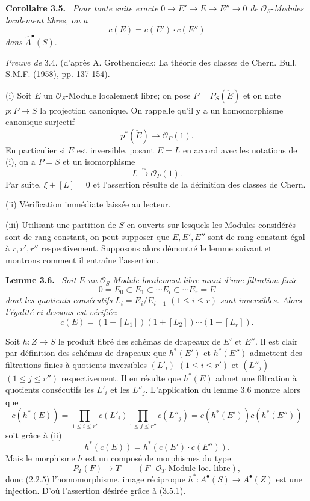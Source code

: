 \documentclass[11pt]{article}
\newenvironment{statement}[1]{\par\medskip\noindent\textbf{#1.}\ }{\par\medskip}
\begin{document}
\begin{statement}{Corollaire 3.5}
\emph{Pour toute suite exacte} $0\to E'\to E\to E''\to0$ \emph{de} $\mathcal O_S$-\emph{Modules localement libres, on a}
\[
c(E)=c(E')\cdot c(E'')
\]
\emph{dans} $\widehat A^{\bullet}(S)$.
\end{statement}

\emph{Preuve de} 3.4. (d'après A. Grothendieck: La théorie des classes de Chern. Bull. S.M.F. (1958), pp. 137-154).

(i)
Soit $E$ un $\mathcal O_S$-Module localement libre; on pose $P=P_S(\check E)$ et on note $p:P\to S$ la projection canonique. On rappelle qu'il y a un homomorphisme canonique surjectif
\[
p^*(\check E)\longrightarrow \mathcal O_P(1).
\]
En particulier si $E$ est inversible, posant $E=L$ en accord avec les notations de (i), on a $P=S$ et un isomorphisme
\[
L\xrightarrow{\sim}\mathcal O_P(1).
\]
Par suite, $\xi+[L]=0$ et l'assertion résulte de la définition des classes de Chern.

(ii) Vérification immédiate laissée au lecteur.

(iii) Utilisant une partition de $S$ en ouverts sur lesquels les Modules considérés sont de rang constant, on peut supposer que $E,E',E''$ sont de rang constant égal à $r,r',r''$ respectivement. Supposons alors démontré le lemme suivant et montrons comment il entraîne l'assertion.

\begin{statement}{Lemme 3.6}
\emph{Soit} $E$ \emph{un} $\mathcal O_S$-\emph{Module localement libre muni d'une filtration finie}
\[
0=E_0\subset E_1\subset\cdots E_i\subset\cdots E_r=E
\]
\emph{dont les quotients consécutifs} $L_i=E_i/E_{i-1}$ $(1\le i\le r)$ \emph{sont inversibles. Alors l'égalité ci-dessous est vérifiée}:
\[
c(E)=(1+[L_1])(1+[L_2])\cdots(1+[L_r]).
\]
\end{statement}

Soit $h:Z\to S$ le produit fibré des schémas de drapeaux de $E'$ et $E''$. Il est clair par définition des schémas de drapeaux que $h^*(E')$ et $h^*(E'')$ admettent des filtrations finies à quotients inversibles $(L'_i)$ $(1\le i\le r')$ et $(L''_j)$ $(1\le j\le r'')$ respectivement. Il en résulte que $h^*(E)$ admet une filtration à quotients consécutifs les $L'_i$ et les $L''_j$. L'application du lemme 3.6 montre alors que
\[
c(h^*(E))=
\prod_{1\le i\le r'}c(L'_i)\prod_{1\le j\le r''}c(L''_j)
=c(h^*(E'))c(h^*(E''))
\]
soit grâce à (ii)
\[
h^*(c(E))=h^*(c(E')\cdot c(E'')).
\tag{3.5.1.}
\]
Mais le morphisme $h$ est un composé de morphismes du type
\[
P_T(F)\longrightarrow T
\qquad (F\text{ }\mathcal O_T\text{-Module loc. libre}),
\]
donc (2.2.5) l'homomorphisme, image réciproque $h^*:A^{\bullet}(S)\to A^{\bullet}(Z)$ est une injection. D'où l'assertion désirée grâce à (3.5.1).
\end{document}
